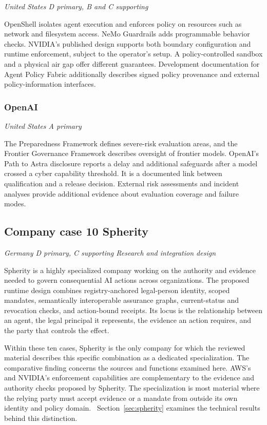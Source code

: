 \textit{United States  \textbullet{}  D primary, B and C supporting}

OpenShell isolates agent execution and enforces policy on resources such as network and filesystem access. NeMo Guardrails adds programmable behavior checks. NVIDIA's published design supports both boundary configuration and runtime enforcement, subject to the operator's setup. A policy-controlled sandbox and a physical air gap offer different guarantees. Development documentation for Agent Policy Fabric additionally describes signed policy provenance and external policy-information interfaces.~\cite{src11,src25,src41,src42}

\subsubsection{OpenAI}

\textit{United States  \textbullet{}  A primary}

The Preparedness Framework defines severe-risk evaluation areas, and the Frontier Governance Framework describes oversight of frontier models. OpenAI's Path to Astra disclosure reports a delay and additional safeguards after a model crossed a cyber capability threshold. It is a documented link between qualification and a release decision. External risk assessments and incident analyses provide additional evidence about evaluation coverage and failure modes.~\cite{src32,src43,src44,src45,src46}

\subsection{Company case 10 Spherity}

\textit{Germany  \textbullet{}  D primary, C supporting  \textbullet{}  Research and integration design}

\nopagebreak[4]
Spherity is a highly specialized company working on the authority and evidence needed to govern consequential AI actions across organizations. The proposed runtime design combines registry-anchored legal-person identity, scoped mandates, semantically interoperable assurance graphs, current-status and revocation checks, and action-bound receipts. Its locus is the relationship between an agent, the legal principal it represents, the evidence an action requires, and the party that controls the effect.~\cite{src5,src6,src7,src17,src28,src47,src48}

Within these ten cases, Spherity is the only company for which the reviewed material describes this specific combination as a dedicated specialization. The comparative finding concerns the sources and functions examined here. AWS's and NVIDIA's enforcement capabilities are complementary to the evidence and authority checks proposed by Spherity. The specialization is most material where the relying party must accept evidence or a mandate from outside its own identity and policy domain.~\cite{src2,src6,src9,src25,src49} Section~\ref{sec:spherity} examines the technical results behind this distinction.

